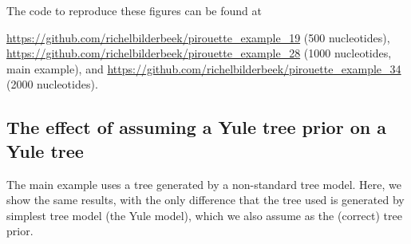 
The code to reproduce these figures can be found at  
\begin{sloppypar}
  \url{https://github.com/richelbilderbeek/pirouette_example_19} (500 nucleotides),
  \url{https://github.com/richelbilderbeek/pirouette_example_28} (1000 nucleotides, main example),
  and \url{https://github.com/richelbilderbeek/pirouette_example_34} (2000 nucleotides).
\end{sloppypar}

\newpage

\subsection{The effect of assuming a Yule tree prior on a Yule tree}
\label{subsec:simplest_correct_parameterization}

The main example uses a tree generated by a non-standard tree model.
Here, we show the same results, with the only difference that
the tree used is generated by simplest tree model (the Yule model),
which we also assume as the (correct) tree prior.

